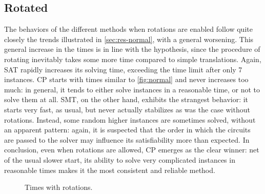 \documentclass[a4paper, 12pt]{article}
\begin{document}
\subsection{Rotated}

The behaviors of the different methods when rotations are enabled follow quite closely the trends illustrated in \cref{sec:res-normal}, with a general worsening. This general increase in the times is in line with the hypothesis, since the procedure of rotating inevitably takes some more time compared to simple translations. Again, SAT rapidly increases its solving time, exceeding the time limit after only 7 instances. CP starts with times similar to \cref{fig:normal} and never increases too much: in general, it tends to either solve instances in a reasonable time, or not to solve them at all. SMT, on the other hand, exhibits the strangest behavior: it starts very fast, as usual, but never actually stabilizes as was the case without rotations. Instead, some random higher instances are sometimes solved, without an apparent pattern: again, it is suspected that the order in which the circuits are passed to the solver may influence its satisfiability more than expected. In conclusion, even when rotations are allowed, CP emerges as the clear winner: net of the usual slower start, its ability to solve very complicated instances in reasonable times makes it the most consistent and reliable method.

\begin{figure}
    \centering
    \caption{Times with rotations.}
    \label{fig:rotated}
\end{figure}
\end{document}
